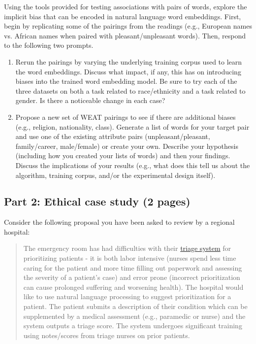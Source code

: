 \documentclass[11pt, letterpaper]{article}
\begin{document}
Using the tools provided for testing associations with pairs of words, explore the implicit bias that can be encoded in natural language word embeddings. First, begin by replicating some of the pairings from the readings (e.g., European names vs. African names when paired with pleasant/unpleasant words).  Then, respond to the following two prompts.

\begin{enumerate}
  \item Rerun the pairings by varying the underlying training corpus used to learn the word embeddings.  Discuss what impact, if any, this has on introducing biases into the trained word embedding model.  Be sure to try each of the three datasets on both a task related to race/ethnicity and a task related to gender.  Is there a noticeable change in each case?
  \item Propose a new set of WEAT pairings to see if there are additional biases (e.g., religion, nationality, class). Generate a list of words for your target pair and use one of the existing attribute pairs (unpleasant/pleasant, family/career, male/female) or create your own.  Describe your hypothesis (including how you created your lists of words) and then your findings.  Discuss the implications of your results (e.g., what does this tell us about the algorithm, training corpus, and/or the experimental design itself).
\end{enumerate}

\subsection*{Part 2: Ethical case study (2 pages)}

Consider the following proposal you have been asked to review by a regional hospital:

\begin{quote}
The emergency room has had difficulties with their \href{https://www.ahrq.gov/sites/default/files/wysiwyg/professionals/systems/hospital/esi/esialgorithm_card.pdf}{triage system} for prioritizing patients - it is both labor intensive (nurses spend less time caring for the patient and more time filling out paperwork and assessing the severity of a patient’s case) and error prone (incorrect prioritization can cause prolonged suffering and worsening health).  The hospital would like to use natural language processing to suggest prioritization for a patient.  The patient submits a description of their condition which can be supplemented by a medical assessment (e.g., paramedic or nurse) and the system outputs a triage score.  The system undergoes significant training using notes/scores from triage nurses on prior patients.
\end{quote}
\end{document}
